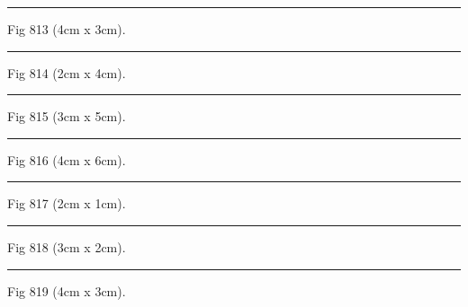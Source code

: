 \documentclass[a4paper,11pt]{article}
\begin{document}
\begin{swarmwrap}%
  \begin{minipage}[t]{4cm}
    \centering
    \rule{\linewidth}{3cm}
    {\footnotesize Fig 813 (4cm x 3cm).}
  \end{minipage}%
\end{swarmwrap}%
\swarmwrapnext
\lipsum[63]%

\begin{swarmwrap}%
  \begin{minipage}[t]{2cm}
    \centering
    \rule{\linewidth}{4cm}
    {\footnotesize Fig 814 (2cm x 4cm).}
  \end{minipage}%
\end{swarmwrap}%
\swarmwrapnext
\lipsum[64]%

\begin{swarmwrap}%
  \begin{minipage}[t]{3cm}
    \centering
    \rule{\linewidth}{5cm}
    {\footnotesize Fig 815 (3cm x 5cm).}
  \end{minipage}%
\end{swarmwrap}%
\swarmwrapnext
\lipsum[65]%

\begin{swarmwrap}%
  \begin{minipage}[t]{4cm}
    \centering
    \rule{\linewidth}{6cm}
    {\footnotesize Fig 816 (4cm x 6cm).}
  \end{minipage}%
\end{swarmwrap}%
\swarmwrapnext
\lipsum[66]%

\begin{swarmwrap}%
  \begin{minipage}[t]{2cm}
    \centering
    \rule{\linewidth}{1cm}
    {\footnotesize Fig 817 (2cm x 1cm).}
  \end{minipage}%
\end{swarmwrap}%
\swarmwrapnext
\lipsum[67]%

\begin{swarmwrap}%
  \begin{minipage}[t]{3cm}
    \centering
    \rule{\linewidth}{2cm}
    {\footnotesize Fig 818 (3cm x 2cm).}
  \end{minipage}%
\end{swarmwrap}%
\swarmwrapnext
\lipsum[68]%

\begin{swarmwrap}%
  \begin{minipage}[t]{4cm}
    \centering
    \rule{\linewidth}{3cm}
    {\footnotesize Fig 819 (4cm x 3cm).}
  \end{minipage}%
\end{swarmwrap}%
\swarmwrapnext
\lipsum[69]%
\end{document}
